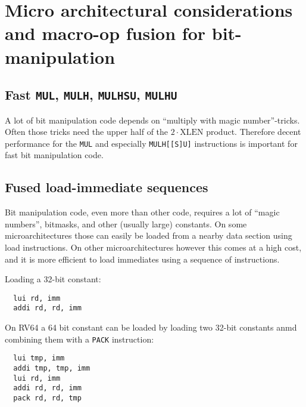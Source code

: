 
\section{Micro architectural considerations and macro-op fusion for bit-manipulation}


\subsection{Fast {\tt MUL}, {\tt MULH}, {\tt MULHSU}, {\tt MULHU}}

A lot of bit manipulation code depends on ``multiply with magic number''-tricks. Often those
tricks need the upper half of the $2 \cdot \textrm{XLEN}$ product. Therefore decent performance
for the \texttt{MUL} and especially \texttt{MULH[[S]U]} instructions is important for fast
bit manipulation code.


\subsection{Fused load-immediate sequences}

Bit manipulation code, even more than other code, requires a lot of ``magic numbers'',
bitmasks, and other (usually large) constants. On some microarchitectures those
can easily be loaded from a nearby data section using load instructions. On other
microarchitectures however this comes at a high cost, and it is more efficient
to load immediates using a sequence of instructions.

Loading a 32-bit constant:

\begin{minipage}{\linewidth}
\begin{verbatim}
  lui rd, imm
  addi rd, rd, imm
\end{verbatim}
\end{minipage}

On RV64 a 64 bit constant can be loaded by loading two 32-bit constants anmd combining them
with a {\tt PACK} instruction:

\begin{minipage}{\linewidth}
\begin{verbatim}
  lui tmp, imm
  addi tmp, tmp, imm
  lui rd, imm
  addi rd, rd, imm
  pack rd, rd, tmp
\end{verbatim}
\end{minipage}


